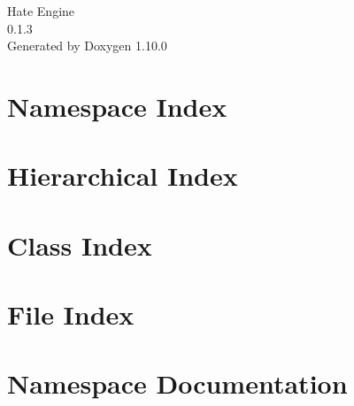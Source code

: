 \documentclass[twoside]{book}
\newcommand{\+}{\discretionary{\mbox{\scriptsize$\hookleftarrow$}}{}{}}
\newcommand{\clearemptydoublepage}{%
    \newpage{\pagestyle{empty}\cleardoublepage}%
  }
\begin{document}
  \raggedbottom
    \hypersetup{pageanchor=false,
                bookmarksnumbered=true,
                pdfencoding=unicode
               }
  \begin{titlepage}
  \vspace*{7cm}
  \begin{center}%
  {\Large Hate Engine}\\
  [1ex]\large 0.\+1.\+3 \\
  \vspace*{1cm}
  {\large Generated by Doxygen 1.10.0}\\
  \end{center}
  \end{titlepage}
  \clearemptydoublepage
  \tableofcontents
  \clearemptydoublepage
  \hypersetup{pageanchor=true}
\chapter{Namespace Index}

\chapter{Hierarchical Index}

\chapter{Class Index}

\chapter{File Index}

\chapter{Namespace Documentation}


\end{document}
